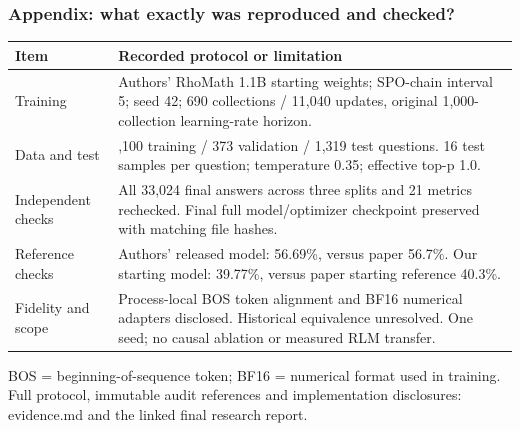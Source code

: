 \documentclass[aspectratio=169,11pt]{beamer}
\newcommand{\source}[1]{\vfill{\scriptsize\color{Gray}#1\par}}
\begin{document}
\appendix
\begin{frame}[t]
\frametitle{Appendix: what exactly was reproduced and checked?}
\small
\begin{tabular}{@{}>{\raggedright\arraybackslash}p{}>{\raggedright\arraybackslash}p{}@{}}
\toprule
Item & Recorded protocol or limitation\\
\midrule
Training &
Authors' RhoMath 1.1B starting weights; SPO-chain interval 5; seed 42;
690 collections / 11,040 updates, original 1,000-collection learning-rate horizon.\\[2mm]
Data and test &
7,100 training / 373 validation / 1,319 test questions.
16 test samples per question; temperature 0.35; effective top-p 1.0.\\[2mm]
Independent checks &
All 33,024 final answers across three splits and 21 metrics rechecked.
Final full model/optimizer checkpoint preserved with matching file hashes.\\[2mm]
Reference checks &
Authors' released model: 56.69\%, versus paper 56.7\%.
Our starting model: 39.77\%, versus paper starting reference 40.3\%.\\[2mm]
Fidelity and scope &
Process-local BOS token alignment and BF16 numerical adapters disclosed.
Historical equivalence unresolved. One seed; no causal
ablation or measured RLM transfer.\\
\bottomrule
\end{tabular}
\source{BOS = beginning-of-sequence token; BF16 = numerical format used in training. Full protocol, immutable audit references and implementation disclosures: evidence.md and the linked final research report.}
\end{frame}
\end{document}
